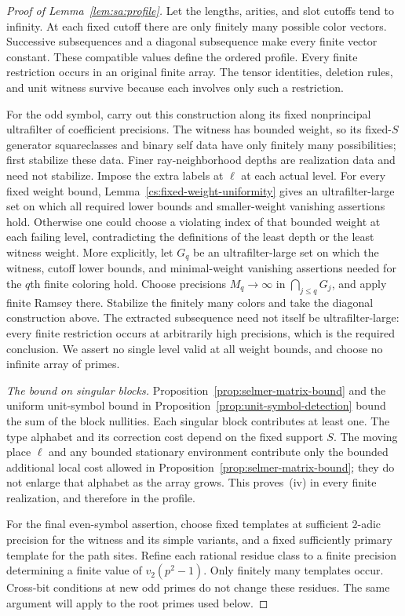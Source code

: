 \begin{proof}[Proof of Lemma~\ref{lem:sa:profile}]
Let the lengths, arities, and slot cutoffs tend to infinity.
At each fixed cutoff there are only finitely many possible color
vectors.  Successive subsequences and a diagonal subsequence make
every finite vector constant.  These compatible values define the
ordered profile.  Every finite restriction occurs in an original
finite array.  The tensor identities, deletion rules, and unit
witness survive because each involves only such a restriction.

For the odd symbol, carry out this construction along its fixed
nonprincipal ultrafilter of coefficient precisions.  The witness has
bounded weight, so its fixed-$S$ generator squareclasses and binary
self data have only finitely many possibilities; first stabilize these
data. Finer ray-neighborhood depths are realization data and need not
stabilize. Impose the extra labels at $\ell$ at each actual level.  For every fixed weight
bound, Lemma~\ref{cs:fixed-weight-uniformity} gives an
ultrafilter-large set on which all required lower bounds and
smaller-weight vanishing assertions hold.  Otherwise one could choose
a violating index of that bounded weight at each failing level,
contradicting the definitions of the least depth or the least witness
weight.  More explicitly, let $G_q$ be an ultrafilter-large set on
which the witness, cutoff lower bounds, and minimal-weight vanishing
assertions needed for the $q$th finite coloring hold.  Choose
precisions $M_q\to\infty$ in
$\bigcap_{j\le q}G_j$, and apply finite Ramsey there.  Stabilize the
finitely many colors and take the diagonal construction above.  The
extracted subsequence need not itself be ultrafilter-large: every
finite restriction occurs at arbitrarily high precisions, which is
the required conclusion.  We assert no single level valid at all
weight bounds, and choose no infinite array of primes.

\emph{The bound on singular blocks.}
Proposition~\ref{prop:selmer-matrix-bound} and the uniform unit-symbol
bound in Proposition~\ref{prop:unit-symbol-detection} bound the sum
of the block nullities.  Each singular block contributes at least one.
The type alphabet and its correction cost depend on the fixed support
$S$.  The moving place $\ell$ and any bounded stationary environment
contribute only the bounded additional local cost allowed in
Proposition~\ref{prop:selmer-matrix-bound}; they do not enlarge that
alphabet as the array grows.  This proves~\textup{(iv)} in every
finite realization, and therefore in the profile.

For the final even-symbol assertion, choose fixed templates at
sufficient $2$-adic precision for the witness and its simple variants,
and a fixed sufficiently primary template for the path sites.
Refine each rational residue class to a finite precision determining
a finite value of $v_2(p^2-1)$.  Only finitely many templates occur.
Cross-bit conditions at new odd primes do not change these residues.
The same argument will apply to the root primes used below.
\end{proof}

